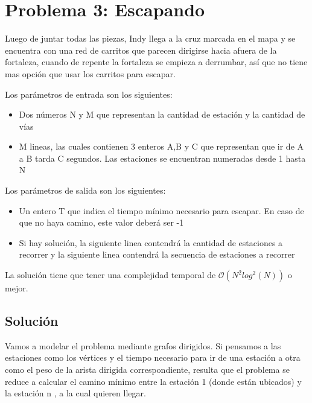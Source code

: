 \section{Problema 3: Escapando}

Luego de juntar todas las piezas, Indy llega a la cruz marcada en el mapa y se encuentra con una red de carritos que parecen dirigirse hacia afuera de la fortaleza, cuando de repente la fortaleza se empieza a derrumbar, así que no tiene mas opción que usar los carritos para escapar.

Los parámetros de entrada son los siguientes:

		\begin{itemize}
		\item Dos números N y M que representan la cantidad de estación y la cantidad de vías
		\item M lineas, las cuales contienen 3 enteros A,B y C que representan que ir de A a B tarda C segundos. Las estaciones se encuentran numeradas desde 1 hasta N
    		\end{itemize}

Los parámetros de salida son los siguientes:

	\begin{itemize}
	\item Un entero T que indica el tiempo mínimo necesario para escapar. En caso de que no haya camino, este valor deberá ser -1
	\item Si hay solución, la siguiente linea contendrá la cantidad de estaciones a recorrer y la siguiente linea contendrá la secuencia de estaciones a recorrer
	\end{itemize}

La solución tiene que tener una complejidad temporal de $\mathcal{O}(N^{2}log^{2}(N))$ o mejor.

\subsection{Solución}

Vamos a modelar el problema mediante grafos dirigidos. Si pensamos a las estaciones como los vértices y el tiempo necesario para ir de una estación a otra como el peso de la arista dirigida correspondiente, resulta que el problema se reduce a calcular el camino mínimo entre la estación 1 (donde están ubicados) y la estación n , a la cual quieren llegar.

